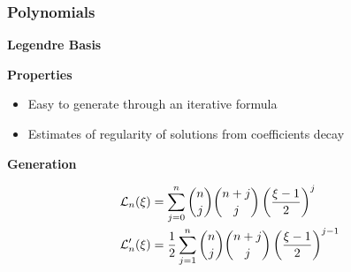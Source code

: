 \begin{frame}
    \frametitle{Polynomials}

    \vspace*{\fill}
    \begin{center}
        {\color{\accentcolor} \Large \textbf{Legendre Basis}}
    \end{center}

    \begin{multicols}{2}

        \begin{center}
            {\color{\accentcolor} \Large \textbf{Properties}}
            \vspace*{0.5cm}

            \begin{minipage}{0.4\textwidth}
                \begin{itemize}
                    \item Easy to generate through an iterative formula
                    \item Estimates of regularity of solutions from coefficients decay
                \end{itemize}
            \end{minipage}
        \end{center}

        \vfill\null
        \columnbreak

        \begin{center}
            {\color{\accentcolor} \Large \textbf{Generation}}
            \vspace*{0.5cm}

            \begin{minipage}{0.4\textwidth}
                \begin{align*}
                    \mathcal{L}_n(\xi) &= \sum_{j = 0}^{n} \binom{n}{j} \binom{n + j}{j} \left( \frac{\xi - 1}{2} \right)^{j} \\
                    \mathcal{L}_n^{\prime}(\xi) &= \frac12 \sum_{j = 1}^{n} \binom{n}{j} \binom{n + j}{j} \left( \frac{\xi - 1}{2} \right)^{j - 1}
                \end{align*}
            \end{minipage}
        \end{center}
    \end{multicols}

    \vspace*{\fill}


\end{frame}
